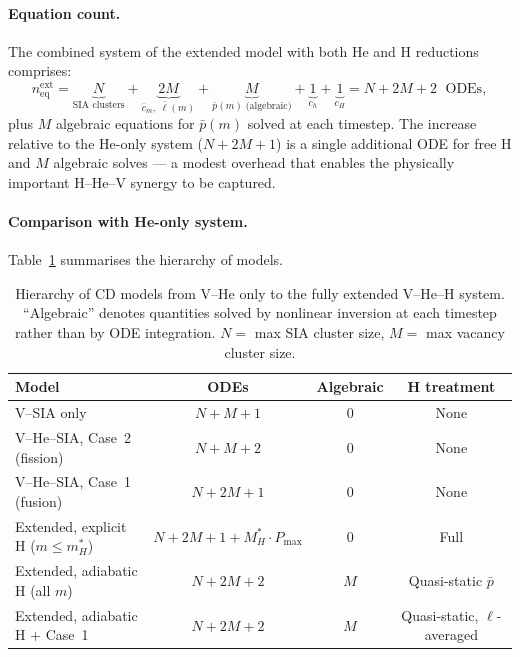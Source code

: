 \documentclass[pdflatex,sn-basic]{sn-jnl} %
\begin{document}
\paragraph{Equation count.}
The combined system of the extended model with both He and H reductions
comprises:
\begin{equation}\label{eq:neq_extended}
    n_{\mathrm{eq}}^{\mathrm{ext}}
    = \underbrace{N}_{\text{SIA clusters}}
    + \underbrace{2M}_{\bar{c}_m,\;\bar{\ell}(m)}
    + \underbrace{M}_{\bar{p}(m)\;\text{(algebraic)}}
    + \underbrace{1}_{c_h}
    + \underbrace{1}_{c_H}
    = N + 2M + 2\;\text{ ODEs},
\end{equation}
plus $M$ algebraic equations for $\bar{p}(m)$ solved at each timestep.
The increase relative to the He-only system ($N + 2M + 1$) is a single
additional ODE for free H and $M$ algebraic solves --- a modest overhead
that enables the physically important H--He--V synergy to be captured.

\paragraph{Comparison with He-only system.}
Table~\ref{tab:extended_comparison} summarises the hierarchy of models.

\begin{table}[htbp]
\centering
\caption{Hierarchy of CD models from V--He only to the fully extended
V--He--H system.  ``Algebraic'' denotes quantities solved by nonlinear
inversion at each timestep rather than by ODE integration.
$N = $ max SIA cluster size, $M = $ max vacancy cluster size.}
\label{tab:extended_comparison}
\renewcommand{\arraystretch}{1.3}
\begin{tabular}{@{}p{5cm}ccc@{}}
\toprule
\textbf{Model} & \textbf{ODEs} & \textbf{Algebraic} & \textbf{H treatment} \\
\midrule
V--SIA only              & $N + M + 1$  & 0 & None \\
V--He--SIA, Case~2 (fission) & $N + M + 2$  & 0 & None \\
V--He--SIA, Case~1 (fusion)  & $N + 2M + 1$ & 0 & None \\
Extended, explicit H ($m \leq m_H^*$) & $N + 2M + 1 + M_H^*\cdot P_{\max}$ & 0 & Full \\
Extended, adiabatic H (all $m$)       & $N + 2M + 2$ & $M$ & Quasi-static $\bar{p}$ \\
Extended, adiabatic H + Case~1        & $N + 2M + 2$ & $M$ & Quasi-static, $\ell$-averaged \\
\bottomrule
\end{tabular}
\end{table}
\end{document}
